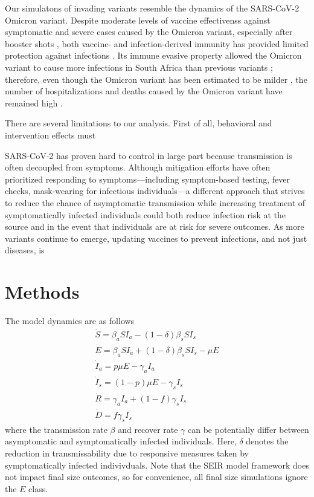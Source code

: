 \documentclass[12pt]{article}
\begin{document}
Our simulatons of invading variants resemble the dynamics of the SARS-CoV-2 Omicron variant.
Despite moderate levels of vaccine effectivenss against symptomatic and severe cases caused by the Omicron variant, especially after booster shots \citep{andres2022omicron}, both vaccine- and infection-derived immunity has provided limited protection against infections \citep{pearson2021omicron}.
Its immune evasive property allowed the Omicron variant to cause more infections in South Africa than previous variants \citep{sun2022omicron};
therefore, even though the Omicron variant has been estimated to be milder \citep{MENNI20221618,ulloa2022estimates}, the number of hospitalizations and deaths caused by the Omicron variant have remained high \citep{Iacobuccio254,faust2022omicron,sigal2022estimating}.

There are several limitations to our analysis.
First of all, behavioral and intervention effects must 

SARS-CoV-2 has proven hard to control in large part because transmission is often decoupled from symptoms. 
Although mitigation efforts have often prioritized responding to symptoms---including symptom-based testing, fever checks, mask-wearing for infectious individuals---a different approach that strives to reduce the chance of asymptomatic transmission while increasing treatment of symptomatically infected individuals could both reduce infection risk at the source and in the event that individuals are at risk for severe outcomes.
As more variants continue to emerge, updating vaccines to prevent infections, and not just diseases, is 



\section*{Methods}
\label{sec.methods}
The model dynamics are as follows
\begin{eqnarray}
\dot{S}=\beta_a S I_a -(1-\delta) \beta_s S I_s \\
\dot{E} = \beta_a S I_a + (1-\delta) \beta_s S I_s - \mu E\\
\dot{I}_a = p \mu E - \gamma_a I_a\\
\dot{I}_s = (1-p) \mu E -\gamma_s I_s\\
\dot{R} = \gamma_a I_a + (1-f) \gamma_s I_s \\
\dot{D} = f \gamma_s I_s
\end{eqnarray}
where the transmission rate $\beta$ and recover rate $\gamma$ can be potentially differ
between asymptomatic and symptomatically infected individuals.  Here, $\delta$ denotes the reduction in transmissability due to responsive measures taken by symptomatically infected indivivduals. Note that the SEIR model framework does not impact final size outcomes, so for convenience, all final size simulations ignore the $E$ class.


\end{document}
